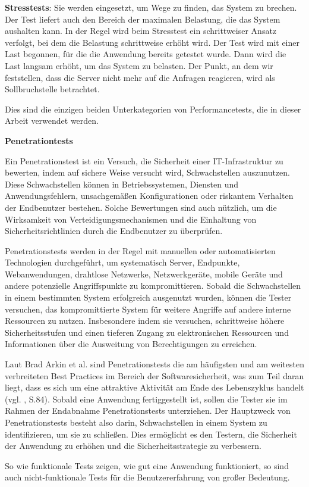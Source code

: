 \textbf{Stresstests}: Sie werden eingesetzt, um Wege zu finden, das System zu
brechen. Der Test liefert auch den Bereich der maximalen Belastung,
die das System aushalten kann. In der Regel wird beim Stresstest ein
schrittweiser Ansatz verfolgt, bei dem die Belastung schrittweise
erhöht wird. Der Test wird mit einer Last begonnen, für die die Anwendung
bereits getestet wurde. Dann wird die Last langsam erhöht, um das System
zu belasten. Der Punkt, an dem wir feststellen, dass die Server nicht mehr
auf die Anfragen reagieren, wird als Sollbruchstelle betrachtet.


Dies sind die einzigen beiden Unterkategorien von Performancetests,
die in dieser Arbeit verwendet werden.



\textbf{Penetrationtests}

Ein Penetrationstest ist ein Versuch, die Sicherheit einer IT-Infrastruktur
zu bewerten, indem auf sichere Weise versucht wird, Schwachstellen
auszunutzen. Diese Schwachstellen können in Betriebssystemen, Diensten
und Anwendungsfehlern, unsachgemäßen Konfigurationen oder riskantem
Verhalten der Endbenutzer bestehen. Solche Bewertungen sind auch nützlich,
um die Wirksamkeit von Verteidigungsmechanismen und die Einhaltung von
Sicherheitsrichtlinien durch die Endbenutzer zu überprüfen.


Penetrationstests werden in der Regel mit manuellen oder automatisierten
Technologien durchgeführt, um systematisch Server, Endpunkte, Webanwendungen,
drahtlose Netzwerke, Netzwerkgeräte, mobile Geräte und andere potenzielle
Angriffspunkte zu kompromittieren. Sobald die Schwachstellen in einem
bestimmten System erfolgreich ausgenutzt wurden, können die Tester versuchen,
das kompromittierte System für weitere Angriffe auf andere interne Ressourcen
zu nutzen. Insbesondere indem sie versuchen, schrittweise höhere
Sicherheitsstufen und einen tieferen Zugang zu elektronischen Ressourcen
und Informationen über die Ausweitung von Berechtigungen zu erreichen.


Laut Brad Arkin et al. sind Penetrationstests die am häufigsten und am
weitesten verbreiteten Best Practices im Bereich der Softwaresicherheit,
was zum Teil daran liegt, dass es sich um eine attraktive Aktivität am
Ende des Lebenszyklus handelt (vgl. , S.84).  Sobald eine
Anwendung fertiggestellt ist, sollen die Tester sie im Rahmen der Endabnahme
Penetrationstests unterziehen. Der Hauptzweck von Penetrationstests besteht
also darin, Schwachstellen in einem System zu identifizieren, um sie zu
schließen. Dies ermöglicht es den Testern, die Sicherheit der Anwendung
zu erhöhen und die Sicherheitsstrategie zu verbessern.


So wie funktionale Tests zeigen, wie gut eine Anwendung funktioniert,
so sind auch nicht-funktionale Tests für die Benutzererfahrung von
großer Bedeutung.


